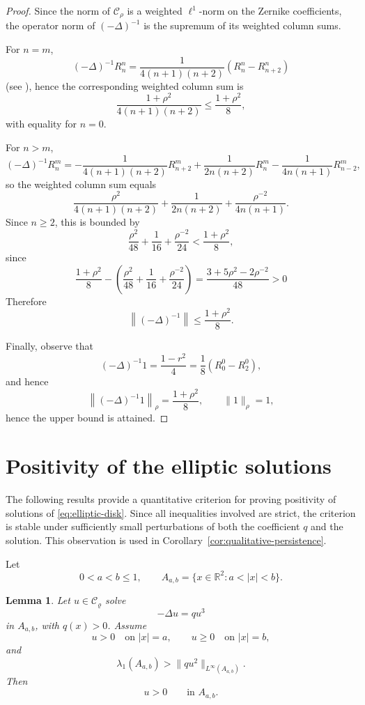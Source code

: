 \documentclass[11pt,a4paper]{amsart}
\newtheorem{lemma}[theorem]{Lemma}
\begin{document}
\begin{proof}
	Since the norm of $\mathcal C_\rho$ is a weighted $\ell^1$-norm on
	the Zernike coefficients, the operator norm of $(-\Delta)^{-1}$ is
	the supremum of its weighted column sums.
	
	For $n=m$,
	\[
	(-\Delta)^{-1}R_n^n=\frac{1}{4(n+1)(n+2)}
	\left(R_n^n-R_{n+2}^n\right)
	\]
	(see \cite{ArioliKoch1}), hence the corresponding weighted column sum is
	\[
	\frac{1+\rho^2}{4(n+1)(n+2)}
	\le
	\frac{1+\rho^2}{8},
	\]
	with equality for $n=0$.
	
	For $n>m$,
	\[
	(-\Delta)^{-1}R_n^m=
	-\frac{1}{4(n+1)(n+2)}R_{n+2}^m+
	\frac{1}{2n(n+2)}R_n^m-\frac{1}{4n(n+1)}R_{n-2}^m,
	\]
	so the weighted column sum equals
	\[
	\frac{\rho^2}{4(n+1)(n+2)}
	+
	\frac{1}{2n(n+2)}
	+
	\frac{\rho^{-2}}{4n(n+1)}.
	\]
	Since $n\ge2$, this is bounded by
	\[
	\frac{\rho^2}{48}
	+\frac{1}{16}
	+\frac{\rho^{-2}}{24}
	<
	\frac{1+\rho^2}{8},
	\]
	since
	$$
\frac{1+\rho^2}{8}-\left(\frac{\rho^2}{48}+\frac1{16}+\frac{\rho^{-2}}{24}\right)
	=\frac{3+5\rho^2-2\rho^{-2}}{48}>0
	$$
	Therefore
	\[
	\left\|(-\Delta)^{-1}\right\|
	\le
	\frac{1+\rho^2}{8}.
	\]
	
	Finally, observe that
	\[
	(-\Delta)^{-1}1=\frac{1-r^2}{4}=\frac18\left(R_0^0-R_2^0\right),
	\]
	and hence
	\[
	\left\|(-\Delta)^{-1}1\right\|_\rho=\frac{1+\rho^2}{8},\qquad\|1\|_\rho=1,
	\]
	hence the upper bound is attained.
\end{proof}


\section{Positivity of the elliptic solutions}
\label{sec:positivity}

The following results provide a quantitative criterion for proving
positivity of solutions of \eqref{eq:elliptic-disk}. Since all
inequalities involved are strict, the criterion is stable under
sufficiently small perturbations of both the coefficient $q$ and the
solution. This observation is used in
Corollary~\ref{cor:qualitative-persistence}.

Let
\[
0<a<b\le1,
\qquad
A_{a,b}=\{x\in\mathbb R^2:a<|x|<b\}.
\]

\begin{lemma}\label{lem:annulus}
	Let $u\in\mathcal C_\varrho$ solve
	\[
	-\Delta u=qu^3
	\]
	in $A_{a,b}$, with $q(x)>0$. Assume
	\[
	u>0
	\quad\text{on }|x|=a,
	\qquad
	u\ge0
	\quad\text{on }|x|=b,
	\]
	and
	\[
	\lambda_1(A_{a,b})
	>
	\|qu^2\|_{L^\infty(A_{a,b})}.
	\]
	Then
	\[
	u>0
	\qquad
	\text{in }A_{a,b}.
	\]
\end{lemma}
\end{document}

